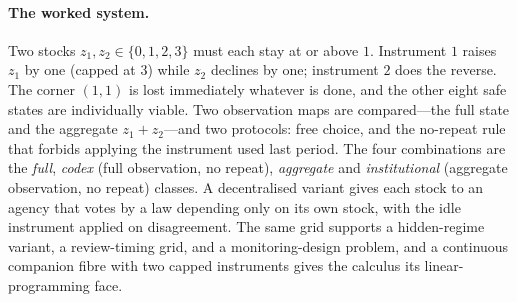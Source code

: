 \documentclass[11pt,a4paper]{article}
\theoremstyle{plain}
\theoremstyle{definition}
\theoremstyle{remark}
\begin{document}
\paragraph{The worked system.}
Two stocks $z_1,z_2\in\{0,1,2,3\}$ must each stay at or above $1$. Instrument $1$ raises $z_1$ by one (capped at $3$) while $z_2$ declines by one; instrument $2$ does the reverse. The corner $(1,1)$ is lost immediately whatever is done, and the other eight safe states are individually viable. Two observation maps are compared---the full state and the aggregate $z_1+z_2$---and two protocols: free choice, and the no-repeat rule that forbids applying the instrument used last period. The four combinations are the \emph{full}, \emph{codex} (full observation, no repeat), \emph{aggregate} and \emph{institutional} (aggregate observation, no repeat) classes. A decentralised variant gives each stock to an agency that votes by a law depending only on its own stock, with the idle instrument applied on disagreement. The same grid supports a hidden-regime variant, a review-timing grid, and a monitoring-design problem, and a continuous companion fibre with two capped instruments gives the calculus its linear-programming face.
\end{document}
